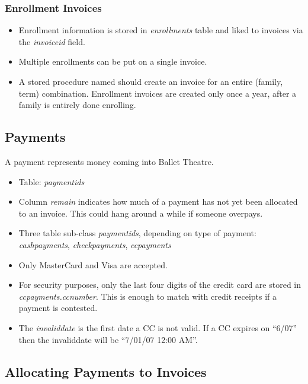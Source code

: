 \documentclass[11pt]{article}
\begin{document}
\subsubsection{Enrollment Invoices}

 \begin{itemize}
 \item Enrollment information is stored in \emph{enrollments} table and liked to invoices via the \emph{invoiceid} field.
 \item Multiple enrollments can be put on a single invoice.
 \item A stored procedure named should create an invoice for an entire (family, term) combination.  Enrollment invoices are created only once a year, after a family is entirely done enrolling.
 \end{itemize}

\subsection{Payments}

A payment represents money coming into Ballet Theatre.
 \begin{itemize}
 \item Table: \emph{paymentids}
 \item Column \emph{remain} indicates how much of a payment has not yet been allocated to an invoice.  This could hang around a while if someone overpays.
 \item Three table sub-class \emph{paymentids}, depending on type of payment: \emph{cashpayments}, \emph{checkpayments}, \emph{ccpayments}
 \item Only MasterCard and Visa are accepted.
 \item For security purposes, only the last four digits of the credit card are stored in \emph{ccpayments.ccnumber}.  This is enough to match with credit receipts if a payment is contested.
 \item The \emph{invaliddate} is the first date a CC is not valid.  If a CC expires on ``6/07'' then the invaliddate will be ``7/01/07 12:00 AM''.
 \end{itemize}

\subsection{Allocating Payments to Invoices}
\end{document}
